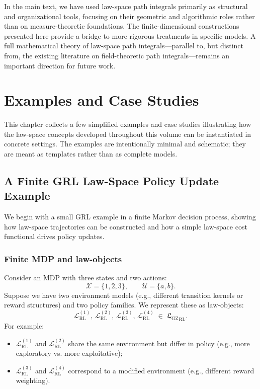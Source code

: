 \documentclass[11pt]{book}
\newcommand{\GZLS}{\ensuremath{\mathfrak{L}_{\mathrm{GZ}}}}
\theoremstyle{plain}
\theoremstyle{definition}
\theoremstyle{remark}
\begin{document}
In the main text, we have used law-space path integrals primarily as
structural and organizational tools, focusing on their geometric and
algorithmic roles rather than on measure-theoretic foundations. The
finite-dimensional constructions presented here provide a bridge to
more rigorous treatments in specific models. A full mathematical
theory of law-space path integrals—parallel to, but distinct from,
the existing literature on field-theoretic path integrals—remains
an important direction for future work.



\chapter{Examples and Case Studies}
\label{chap:examples-case-studies}


This chapter collects a few simplified examples and case studies
illustrating how the law-space concepts developed throughout this
volume can be instantiated in concrete settings. The examples are
intentionally minimal and schematic; they are meant as templates
rather than as complete models.

\section{A Finite GRL Law-Space Policy Update Example}
\label{sec:example-grl-finite}


We begin with a small GRL example in a finite Markov decision
process, showing how law-space trajectories can be constructed and
how a simple law-space cost functional drives policy updates.

\subsection*{Finite MDP and law-objects}

Consider an MDP with three states and two actions:
\[
   \mathcal{X} = \{1,2,3\},
   \qquad
   \mathcal{U} = \{a,b\}.
\]
Suppose we have two environment models (e.g., different transition
kernels or reward structures) and two policy families. We represent
these as law-objects:
\[
   \mathcal{L}_{\mathrm{RL}}^{(1)},\,
   \mathcal{L}_{\mathrm{RL}}^{(2)},\,
   \mathcal{L}_{\mathrm{RL}}^{(3)},\,
   \mathcal{L}_{\mathrm{RL}}^{(4)}
   \;\in\;
   {\GZLS}_{\mathrm{RL}}.
\]
For example:
\begin{itemize}
  \item $\mathcal{L}_{\mathrm{RL}}^{(1)}$ and
        $\mathcal{L}_{\mathrm{RL}}^{(2)}$ share the same
        environment but differ in policy (e.g., more exploratory vs.
        more exploitative);
  \item $\mathcal{L}_{\mathrm{RL}}^{(3)}$ and
        $\mathcal{L}_{\mathrm{RL}}^{(4)}$ correspond to a modified
        environment (e.g., different reward weighting).
\end{itemize}
\end{document}

